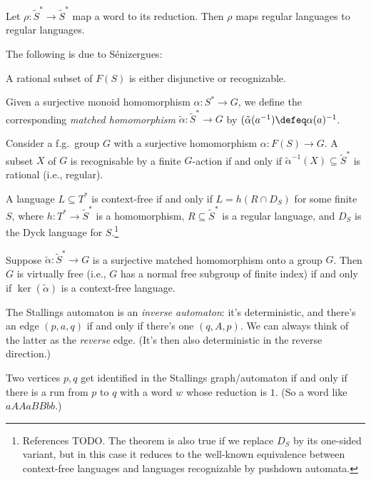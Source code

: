 \begin{lemma}
  Let $\rho : \tilde S^* \to \tilde S^*$ map a word to its reduction.
  Then $\rho$ maps regular languages to regular languages.
\end{lemma}

The following is due to Sénizergues:
\begin{theorem}
  A rational subset of $F(S)$ is either disjunctive or recognizable.
\end{theorem}

Given a surjective monoid homomorphism $\alpha : S^* \to G$,
we define the corresponding \emph{matched homomorphism} $\tilde\alpha : \tilde S^* \to G$ by $(\tilde\alpha(a^{-1}) \defeq \alpha(a)^{-1}$.
\begin{theorem}[?]
  Consider a f.g.\ group $G$ with a surjective homomorphism
  $\alpha : F(S) \to G$. A subset $X$ of $G$ is recognisable by a finite $G$-action
  if and only if $\tilde\alpha^{-1}(X) \subseteq \tilde S^*$ is rational (i.e., regular).
\end{theorem}
\begin{theorem}
  A language $L \subseteq T^*$ is context-free if and only if
  $L = h(R \cap D_S)$ for some finite $S$,
  where $h : T^* \to \tilde S^*$ is a homomorphism,
  $R \subseteq \tilde S^*$ is a regular language, and
  $D_S$ is the Dyck language for $S$.\footnote{%
    References TODO. The theorem is also true if we replace $D_S$
    by its one-sided variant, but in this case it reduces to
    the well-known equivalence between context-free languages
    and languages recognizable by pushdown automata.}
\end{theorem}
\begin{theorem}
  Suppose $\tilde\alpha : \tilde S^* \to G$ is a surjective matched homomorphism
  onto a group $G$. Then $G$ is virtually free (i.e., $G$ has a normal free subgroup of finite index) if and only if $\ker(\tilde\alpha)$ is a context-free language.
\end{theorem}
\begin{theorem}

\end{theorem}
The Stallings automaton is an \emph{inverse automaton}:
it's deterministic,
and there's an edge $(p,a,q)$ if and only if there's one $(q,A,p)$.
We can always think of the latter as the \emph{reverse} edge.
(It's then also deterministic in the reverse direction.)

Two vertices $p,q$ get identified in the Stallings graph/automaton
if and only if there is a run from $p$ to $q$ with a word $w$
whose reduction is $1$. (So a word like $aAAaBBbb$.)

